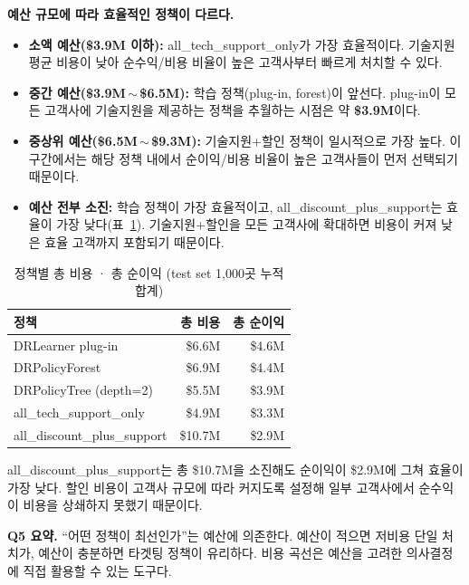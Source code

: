 \documentclass[11pt]{article}
\begin{document}
\textbf{예산 규모에 따라 효율적인 정책이 다르다.}

\begin{itemize}[leftmargin=1.4em, itemsep=2pt]
  \item \textbf{소액 예산(\$3.9M 이하):} all\_tech\_support\_only가 가장 효율적이다. 기술지원 평균 비용이 낮아 순수익/비용 비율이 높은 고객사부터 빠르게 처치할 수 있다.
  \item \textbf{중간 예산(\$3.9M\,$\sim$\,\$6.5M):} 학습 정책(plug-in, forest)이 앞선다. plug-in이 모든 고객사에 기술지원을 제공하는 정책을 추월하는 시점은 약 \textbf{\$3.9M}이다.
  \item \textbf{중상위 예산(\$6.5M\,$\sim$\,\$9.3M):} 기술지원+할인 정책이 일시적으로 가장 높다. 이 구간에서는 해당 정책 내에서 순이익/비용 비율이 높은 고객사들이 먼저 선택되기 때문이다.
  \item \textbf{예산 전부 소진:} 학습 정책이 가장 효율적이고, all\_discount\_plus\_support는 효율이 가장 낮다(표~\ref{tab:costcurve}). 기술지원+할인을 모든 고객사에 확대하면 비용이 커져 낮은 효율 고객까지 포함되기 때문이다.
\end{itemize}

\FloatBarrier
\begin{table}[h]
\centering
\small
\caption{정책별 총 비용 · 총 순이익 (test set 1{,}000곳 누적 합계)}
\label{tab:costcurve}
\begin{tabular}{lrr}
\toprule
정책 & 총 비용 & 총 순이익 \\
\midrule
DRLearner plug-in & \$6.6M & \$4.6M \\
DRPolicyForest & \$6.9M & \$4.4M \\
DRPolicyTree (depth=2) & \$5.5M & \$3.9M \\
all\_tech\_support\_only & \$4.9M & \$3.3M \\
all\_discount\_plus\_support & \$10.7M & \$2.9M \\
\bottomrule
\end{tabular}
\end{table}

all\_discount\_plus\_support는 총 \$10.7M을 소진해도 순이익이 \$2.9M에 그쳐 효율이 가장 낮다. 할인 비용이 고객사 규모에 따라 커지도록 설정해 일부 고객사에서 순수익이 비용을 상쇄하지 못했기 때문이다.

\textbf{Q5 요약.} ``어떤 정책이 최선인가''는 예산에 의존한다. 예산이 적으면 저비용 단일 처치가, 예산이 충분하면 타겟팅 정책이 유리하다. 비용 곡선은 예산을 고려한 의사결정에 직접 활용할 수 있는 도구다.

\end{document}
